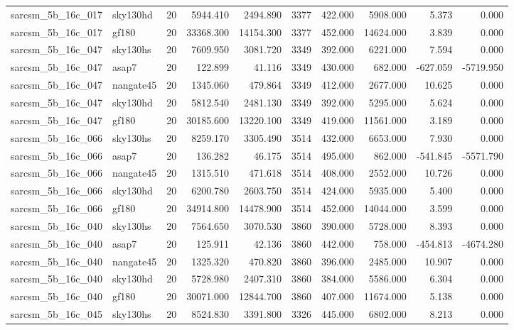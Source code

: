 \documentclass{article}
\begin{document}
\begin{longtable}{llrrrrrrrr}
sarcsm\_5b\_16c\_017 & sky130hd & 20 & 5944.410 & 2494.890 & 3377 & 422.000 & 5908.000 & 5.373 & 0.000 \\
sarcsm\_5b\_16c\_017 & gf180 & 20 & 33368.300 & 14154.300 & 3377 & 452.000 & 14624.000 & 3.839 & 0.000 \\
sarcsm\_5b\_16c\_047 & sky130hs & 20 & 7609.950 & 3081.720 & 3349 & 392.000 & 6221.000 & 7.594 & 0.000 \\
sarcsm\_5b\_16c\_047 & asap7 & 20 & 122.899 & 41.116 & 3349 & 430.000 & 682.000 & -627.059 & -5719.950 \\
sarcsm\_5b\_16c\_047 & nangate45 & 20 & 1345.060 & 479.864 & 3349 & 412.000 & 2677.000 & 10.625 & 0.000 \\
sarcsm\_5b\_16c\_047 & sky130hd & 20 & 5812.540 & 2481.130 & 3349 & 392.000 & 5295.000 & 5.624 & 0.000 \\
sarcsm\_5b\_16c\_047 & gf180 & 20 & 30185.600 & 13220.100 & 3349 & 419.000 & 11561.000 & 3.189 & 0.000 \\
sarcsm\_5b\_16c\_066 & sky130hs & 20 & 8259.170 & 3305.490 & 3514 & 432.000 & 6653.000 & 7.930 & 0.000 \\
sarcsm\_5b\_16c\_066 & asap7 & 20 & 136.282 & 46.175 & 3514 & 495.000 & 862.000 & -541.845 & -5571.790 \\
sarcsm\_5b\_16c\_066 & nangate45 & 20 & 1315.510 & 471.618 & 3514 & 408.000 & 2552.000 & 10.726 & 0.000 \\
sarcsm\_5b\_16c\_066 & sky130hd & 20 & 6200.780 & 2603.750 & 3514 & 424.000 & 5935.000 & 5.400 & 0.000 \\
sarcsm\_5b\_16c\_066 & gf180 & 20 & 34914.800 & 14478.900 & 3514 & 452.000 & 14044.000 & 3.599 & 0.000 \\
sarcsm\_5b\_16c\_040 & sky130hs & 20 & 7564.650 & 3070.530 & 3860 & 390.000 & 5728.000 & 8.393 & 0.000 \\
sarcsm\_5b\_16c\_040 & asap7 & 20 & 125.911 & 42.136 & 3860 & 442.000 & 758.000 & -454.813 & -4674.280 \\
sarcsm\_5b\_16c\_040 & nangate45 & 20 & 1325.320 & 470.820 & 3860 & 396.000 & 2485.000 & 10.907 & 0.000 \\
sarcsm\_5b\_16c\_040 & sky130hd & 20 & 5728.980 & 2407.310 & 3860 & 384.000 & 5586.000 & 6.304 & 0.000 \\
sarcsm\_5b\_16c\_040 & gf180 & 20 & 30071.000 & 12844.700 & 3860 & 407.000 & 11674.000 & 5.138 & 0.000 \\
sarcsm\_5b\_16c\_045 & sky130hs & 20 & 8524.830 & 3391.800 & 3326 & 445.000 & 6802.000 & 8.213 & 0.000 \\

\end{longtable}
\end{document}
